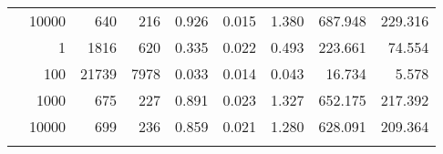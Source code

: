 \begin{table}
\begin{tabular}{rrrrrrrrr}
	            
					 &  
					 
					\multirow{ 1 }{*}{ 10000 } &
					
						
							    
							     640  & 216  
	                           & 0.926 & 0.015 & 1.380
	                           & 687.948 & 229.316  \\
	                
	            
	        
				\noalign{\smallskip}\hline
				\multirow{ 4 }{*}{ 250000 } &
				
					
					 
					\multirow{ 1 }{*}{ 1 } &
					
						
							    
							     1816  & 620  
	                           & 0.335 & 0.022 & 0.493
	                           & 223.661 & 74.554  \\
	                
	            
					 &  
					 
					\multirow{ 1 }{*}{ 100 } &
					
						
							    
							     21739  & 7978  
	                           & 0.033 & 0.014 & 0.043
	                           & 16.734 & 5.578  \\
	                
	            
					 &  
					 
					\multirow{ 1 }{*}{ 1000 } &
					
						
							    
							     675  & 227  
	                           & 0.891 & 0.023 & 1.327
	                           & 652.175 & 217.392  \\
	                
	            
					 &  
					 
					\multirow{ 1 }{*}{ 10000 } &
					
						
							    
							     699  & 236  
	                           & 0.859 & 0.021 & 1.280
	                           & 628.091 & 209.364  \\
	                
	            
	        
				\noalign{\smallskip}\hline
				\multirow{ 3 }{*}{ 500000 } &
				

\end{tabular}
\end{table}
